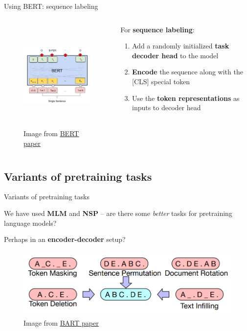 \documentclass[12pt,aspectratio=169,handout]{beamer}
\begin{document}
\begin{frame}{Using BERT: sequence labeling}
	\begin{columns}[T] %
		\begin{column}{.48\textwidth}
	\begin{figure}[h]
		\includegraphics[height=5.5cm]{bert-seq-labeling}
		\caption*{Image from \href{https://arxiv.org/pdf/1810.04805.pdf}{\underline{BERT paper}}}
	\end{figure}
\end{column}

\begin{column}{.48\textwidth}
	For \textbf{sequence labeling}:
	\begin{enumerate}
		\item Add a randomly initialized \textbf{task decoder head} to the model
		\pause
		\item \textbf{Encode} the sequence along with the [CLS] special token
		\pause
		\item Use the \textbf{token representations} as inputs to decoder head
	\end{enumerate}
\end{column}
\end{columns}

\end{frame}


\subsection{Variants of pretraining tasks}

\begin{frame}{Variants of pretraining tasks}

We have used \textbf{MLM} and \textbf{NSP} -- are there some \textit{better} tasks for pretraining language models?
\pause

Perhaps in an \textbf{encoder-decoder} setup?

\pause

\begin{figure}[h]
	\includegraphics[height=3.5cm]{bart-pretraining-tasks}
	\caption*{Image from \href{https://arxiv.org/pdf/1910.13461.pdf}{\underline{BART paper}}}
\end{figure}

\end{frame}
\end{document}
